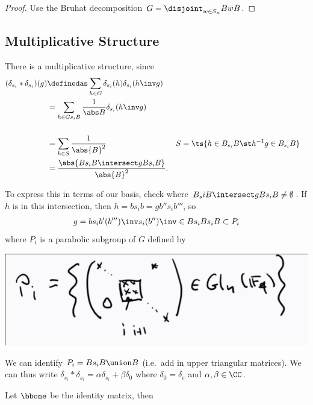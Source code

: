 \begin{proof}

Use the Bruhat decomposition \(G = \disjoint_{w\in S_n} BwB\).

\end{proof}

\hypertarget{multiplicative-structure}{%
\subsection{Multiplicative Structure}\label{multiplicative-structure}}

There is a multiplicative structure, since
\begin{align*}
(\delta_{s_i} \ast \delta_{s_i})(g) 
&\definedas \sum_{h\in G} \delta_{s_i}(h) \delta_{s_i}(h\inv g) \\
&= \sum_{h\in Gs_i B} {1\over \abs B} \delta_{s_i} (h\inv g) \\ \\
&= \sum_{\substack{ h\in S }} 
{1\over \abs{B}^2}
&& S = \ts{h\in B_{s_i} B \st h^{-1} g \in B_{s_i} B} \\
&= {\abs{Bs_i B \intersect gBs_i B} \over \abs{B}^2}
.\end{align*}

To express this in terms of our basis, check where
\(B_si B \intersect g B s_i B \neq \emptyset\). If \(h\) is in this
intersection, then \(h = bs_i b = gb'' s_i b'''\), so
\begin{align*}
g = b s_i b' (b''')\inv s_i (b'')\inv \in Bs_i Bs_i B \subset P_i
\end{align*} where \(P_i\) is a parabolic subgroup of \(G\) defined by

\includegraphics{figures/image_2020-07-09-11-47-18.png}

We can identify \(P_i = Bs_i B \union B\) (i.e.~add in upper triangular
matrices). We can thus write
\(\delta_{s_i} \ast \delta_{s_i} = \alpha \delta_{s_i} + \beta \delta_0\)
where \(\delta_0 = \delta_e\) and \(\alpha, \beta \in \CC\).

Let \(\bbone\) be the identity matrix, then

